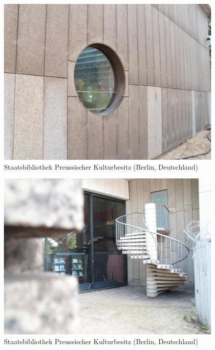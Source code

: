 \documentclass[a4paper,
fontsize=11pt,
oneside,
numbers=noperiodatend,
parskip=half-,
bibliography=totoc,
final
]{scrartcl}
\begin{document}
\begin{figure}[htbp]
\centering
\includegraphics{./img/011.jpg}
\caption{Staatsbibliothek Preussischer Kulturbesitz (Berlin,
Deutschland)}
\end{figure}

\begin{figure}[htbp]
\centering
\includegraphics{./img/012.jpg}
\caption{Staatsbibliothek Preussischer Kulturbesitz (Berlin,
Deutschland)}
\end{figure}
\end{document}
